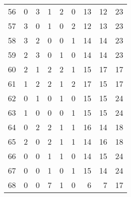 \documentclass{article}
\begin{document}
\begin{center}
\begin{tabular}{lrrrrrrrr}
56 & 0 & 3 & 1 & 2 & 0 & 13 & 12 & 23 \\
57 & 3 & 0 & 1 & 0 & 2 & 12 & 13 & 23 \\
58 & 3 & 2 & 0 & 0 & 1 & 14 & 14 & 23 \\
59 & 2 & 3 & 0 & 1 & 0 & 14 & 14 & 23 \\
60 & 2 & 1 & 2 & 2 & 1 & 15 & 17 & 17 \\
61 & 1 & 2 & 2 & 1 & 2 & 17 & 15 & 17 \\
62 & 0 & 1 & 0 & 1 & 0 & 15 & 15 & 24 \\
63 & 1 & 0 & 0 & 0 & 1 & 15 & 15 & 24 \\
64 & 0 & 2 & 2 & 1 & 1 & 16 & 14 & 18 \\
65 & 2 & 0 & 2 & 1 & 1 & 14 & 16 & 18 \\
66 & 0 & 0 & 1 & 1 & 0 & 14 & 15 & 24 \\
67 & 0 & 0 & 1 & 0 & 1 & 15 & 14 & 24 \\
68 & 0 & 0 & 7 & 1 & 0 & 6 & 7 & 17 \\
\bottomrule
\end{tabular}


\end{center}
\end{document}
